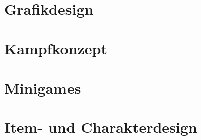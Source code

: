 \section{Grafikdesign}


\section{Kampfkonzept}


\section{Minigames}


\section{Item- und Charakterdesign}


